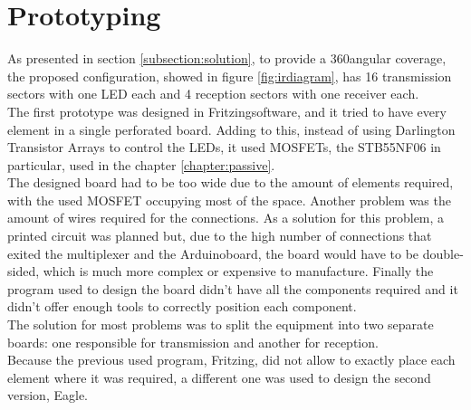 \section{Prototyping}
\label{section:prototypes}
As presented in section \ref{subsection:solution}, to provide a 360\degree angular coverage, the proposed configuration, showed in figure \ref{fig:irdiagram}, has 16 transmission sectors with one LED each and 4 reception sectors with one receiver each. \\
The first prototype was designed in Fritzing\texttrademark software, and it tried to have every element in a single perforated board. Adding to this, instead of using Darlington Transistor Arrays to control the LEDs, it used MOSFETs, the STB55NF06 in particular, used in the chapter \ref{chapter:passive}.\\ 
The designed board had to be too wide due to the amount of elements required, with the used MOSFET occupying most of the space. Another problem was the amount of wires required for the connections. As a solution for this problem, a printed circuit was planned but, due to the high number of connections that exited the multiplexer and the Arduino\texttrademark board, the board would have to be double-sided, which is much more complex or expensive to manufacture. Finally the program used to design the board didn't have all the components required and it didn't offer enough tools to correctly position each component.\\

The solution for most problems was to split the equipment into two separate boards: one responsible for transmission and another for reception.\\
Because the previous used program, Fritzing\texttrademark , did not allow to exactly place each element where it was required, a different one was used to design the second version, Eagle\texttrademark .\\

